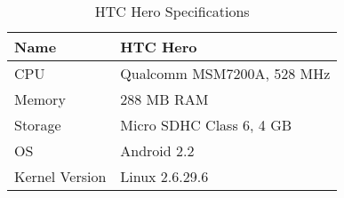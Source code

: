 \begin{table}
  \centering
  \caption{HTC Hero Specifications}
  \begin{tabular}{ | l | l |}
    \hline
    Name    & HTC Hero                          \\ \hline
    CPU     & Qualcomm MSM7200A, 528 MHz        \\ \hline
    Memory  & 288 MB \ac{RAM}                   \\ \hline
    Storage & Micro SDHC Class 6, 4 GB          \\ \hline
    OS      & Android 2.2                        \\ \hline
    Kernel Version & Linux 2.6.29.6             \\ \hline
  \end{tabular}
  \label{tbl:device:hero}
\end{table}
